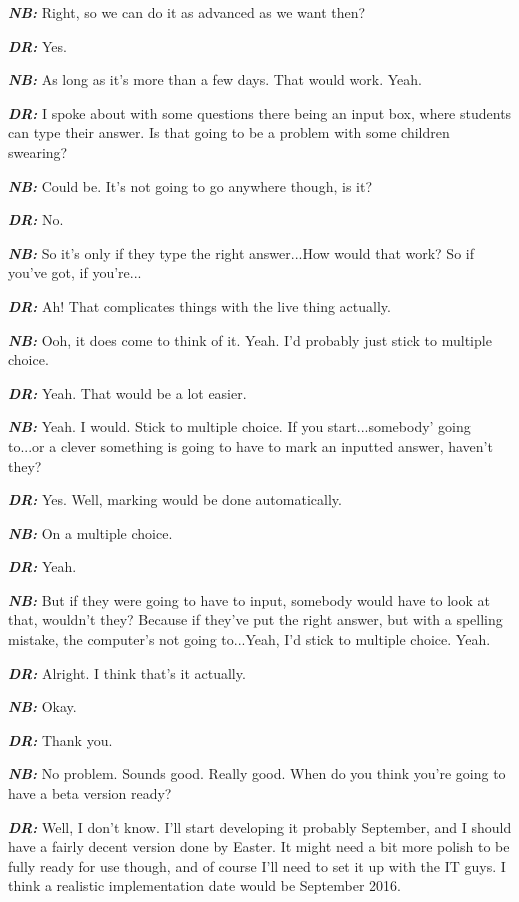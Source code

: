 \textit{\textbf{NB:}} Right, so we can do it as advanced as we want then?

\textit{\textbf{DR:}} Yes.

\textit{\textbf{NB:}} As long as it's more than a few days. That would work. Yeah.

\textit{\textbf{DR:}} I spoke about with some questions there being an input box, where students can type their answer. Is that going to be a problem with some children swearing?

\textit{\textbf{NB:}} Could be. It's not going to go anywhere though, is it?

\textit{\textbf{DR:}} No.

\textit{\textbf{NB:}} So it's only if they type the right answer...How would that work? So if you've got, if you're...

\textit{\textbf{DR:}} Ah! That complicates things with the live thing actually.

\textit{\textbf{NB:}} Ooh, it does come to think of it. Yeah. I'd probably just stick to multiple choice.

\textit{\textbf{DR:}} Yeah. That would be a lot easier.

\textit{\textbf{NB:}} Yeah. I would. Stick to multiple choice. If you start...somebody' going to...or a clever something is going to have to mark an inputted answer, haven't they?

\textit{\textbf{DR:}} Yes. Well, marking would be done automatically.

\textit{\textbf{NB:}} On a multiple choice.

\textit{\textbf{DR:}} Yeah.

\textit{\textbf{NB:}} But if they were going to have to input, somebody would have to look at that, wouldn't they? Because if they've put the right answer, but with a spelling mistake, the computer's not going to...Yeah, I'd stick to multiple choice. Yeah.

\textit{\textbf{DR:}} Alright. I think that's it actually.

\textit{\textbf{NB:}} Okay.

\textit{\textbf{DR:}} Thank you.

\textit{\textbf{NB:}} No problem. Sounds good. Really good. When do you think you're going to have a beta version ready?

\textit{\textbf{DR:}} Well, I don't know. I'll start developing it probably September, and I should have a fairly decent version done by Easter. It might need a bit more polish to be fully ready for use though, and of course I'll need to set it up with the IT guys. I think a realistic implementation date would be September 2016.

